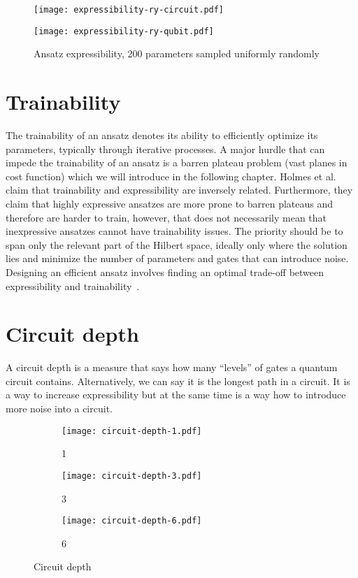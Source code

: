 \begin{figure}[H]
    \centering
    \begin{minipage}{0.4\linewidth}
        \centering
        \texttt{[image: expressibility-ry-circuit.pdf]}
    \end{minipage}
    \begin{minipage}{0.4\linewidth}
        \centering
        \texttt{[image: expressibility-ry-qubit.pdf]}
    \end{minipage}
    \caption{Ansatz expressibility, 200 parameters sampled uniformly randomly}
\end{figure}

\section{Trainability}
The trainability of an ansatz denotes its ability to efficiently optimize its parameters, typically through iterative processes. A major hurdle that can impede the trainability of an ansatz is a barren plateau problem (vast planes in cost function) which we will introduce in the following chapter. Holmes et al.~\cite{holmes2022} claim that trainability and expressibility are inversely related. Furthermore, they claim that highly expressive ansatzes are more prone to barren plateaus and therefore are harder to train, however, that does not necessarily mean that inexpressive ansatzes cannot have trainability issues. The priority should be to span only the relevant part of the Hilbert space, ideally only where the solution lies and minimize the number of parameters and gates that can introduce noise. Designing an efficient ansatz involves finding an optimal trade-off between expressibility and trainability~\cite{holmes2022}.

\section{Circuit depth}
A circuit depth is a measure that says how many ``levels'' of gates a quantum circuit contains. Alternatively, we can say it is the longest path in a circuit. It is a way to increase expressibility but at the same time is a way how to introduce more noise into a circuit.

\begin{figure}[H]
    \centering
    \begin{subfigure}[b]{0.2\textwidth}
        \centering
        \texttt{[image: circuit-depth-1.pdf]} 
        \caption*{1}
    \end{subfigure}
    \hfill
    \begin{subfigure}[b]{0.3\textwidth}
        \centering
        \texttt{[image: circuit-depth-3.pdf]}
        \caption*{3}
    \end{subfigure}
    \hfill
    \begin{subfigure}[b]{0.45\textwidth}
        \centering
        \texttt{[image: circuit-depth-6.pdf]}
        \caption*{6}
    \end{subfigure}
       \caption{Circuit depth}
       \label{fig:circuit-depth}
\end{figure}

